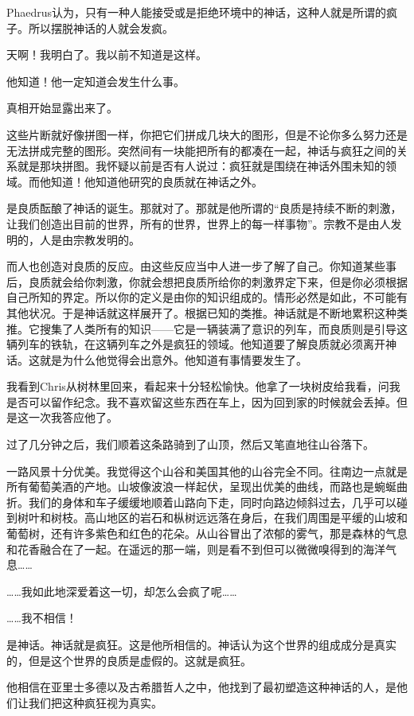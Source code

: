 \documentclass[UTF8]{article}
\begin{document}
\par Phaedrus认为，只有一种人能接受或是拒绝环境中的神话，这种人就是所谓的疯子。所以摆脱神话的人就会发疯。
\par 天啊！我明白了。我以前不知道是这样。
\par 他知道！他一定知道会发生什么事。
\par 真相开始显露出来了。
\par 这些片断就好像拼图一样，你把它们拼成几块大的图形，但是不论你多么努力还是无法拼成完整的图形。突然间有一块能把所有的都凑在一起，神话与疯狂之间的关系就是那块拼图。我怀疑以前是否有人说过：疯狂就是围绕在神话外围未知的领域。而他知道！他知道他研究的良质就在神话之外。
\par 是良质酝酿了神话的诞生。那就对了。那就是他所谓的“良质是持续不断的刺激，让我们创造出目前的世界，所有的世界，世界上的每一样事物”。宗教不是由人发明的，人是由宗教发明的。
\par 而人也创造对良质的反应。由这些反应当中人进一步了解了自己。你知道某些事后，良质就会给你刺激，你就会想把良质所给你的刺激界定下来，但是你必须根据自己所知的界定。所以你的定义是由你的知识组成的。情形必然是如此，不可能有其他状况。于是神话就这样展开了。根据已知的类推。神话就是不断地累积这种类推。它搜集了人类所有的知识——它是一辆装满了意识的列车，而良质则是引导这辆列车的铁轨，在这辆列车之外是疯狂的领域。他知道要了解良质就必须离开神话。这就是为什么他觉得会出意外。他知道有事情要发生了。
\par 我看到Chris从树林里回来，看起来十分轻松愉快。他拿了一块树皮给我看，问我是否可以留作纪念。我不喜欢留这些东西在车上，因为回到家的时候就会丢掉。但是这一次我答应他了。
\par 过了几分钟之后，我们顺着这条路骑到了山顶，然后又笔直地往山谷落下。
\par 一路风景十分优美。我觉得这个山谷和美国其他的山谷完全不同。往南边一点就是所有葡萄美酒的产地。山坡像波浪一样起伏，呈现出优美的曲线，而路也是蜿蜒曲折。我们的身体和车子缓缓地顺着山路向下走，同时向路边倾斜过去，几乎可以碰到树叶和树枝。高山地区的岩石和枞树远远落在身后，在我们周围是平缓的山坡和葡萄树，还有许多紫色和红色的花朵。从山谷冒出了浓郁的雾气，那是森林的气息和花香融合在了一起。在遥远的那一端，则是看不到但可以微微嗅得到的海洋气息……
\par ……我如此地深爱着这一切，却怎么会疯了呢……
\par ……我不相信！
\par 是神话。神话就是疯狂。这是他所相信的。神话认为这个世界的组成成分是真实的，但是这个世界的良质是虚假的。这就是疯狂。
\par 他相信在亚里士多德以及古希腊哲人之中，他找到了最初塑造这种神话的人，是他们让我们把这种疯狂视为真实。
\end{document}
